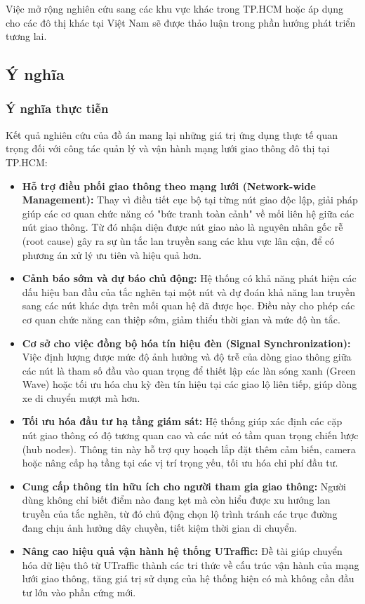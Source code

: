 Việc mở rộng nghiên cứu sang các khu vực khác trong TP.HCM hoặc áp dụng cho các đô thị khác tại Việt Nam sẽ được thảo luận trong phần hướng phát triển tương lai.

\newpage
\subsection{Ý nghĩa}
\subsubsection{Ý nghĩa thực tiễn}
Kết quả nghiên cứu của đồ án mang lại những giá trị ứng dụng thực tế quan trọng đối với công tác quản lý và vận hành mạng lưới giao thông đô thị tại TP.HCM:

\begin{itemize}
    \item \textbf{Hỗ trợ điều phối giao thông theo mạng lưới (Network-wide Management):} Thay vì điều tiết cục bộ tại từng nút giao độc lập, giải pháp giúp các cơ quan chức năng có "bức tranh toàn cảnh" về mối liên hệ giữa các nút giao thông. Từ đó nhận diện được nút giao nào là nguyên nhân gốc rễ (root cause) gây ra sự ùn tắc lan truyền sang các khu vực lân cận, để có phương án xử lý ưu tiên và hiệu quả hơn.
    
    \item \textbf{Cảnh báo sớm và dự báo chủ động:} Hệ thống có khả năng phát hiện các dấu hiệu ban đầu của tắc nghẽn tại một nút và dự đoán khả năng lan truyền sang các nút khác dựa trên mối quan hệ đã được học. Điều này cho phép các cơ quan chức năng can thiệp sớm, giảm thiểu thời gian và mức độ ùn tắc.
    
    \item \textbf{Cơ sở cho việc đồng bộ hóa tín hiệu đèn (Signal Synchronization):} Việc định lượng được mức độ ảnh hưởng và độ trễ của dòng giao thông giữa các nút là tham số đầu vào quan trọng để thiết lập các làn sóng xanh (Green Wave) hoặc tối ưu hóa chu kỳ đèn tín hiệu tại các giao lộ liên tiếp, giúp dòng xe di chuyển mượt mà hơn.
    
    \item \textbf{Tối ưu hóa đầu tư hạ tầng giám sát:} Hệ thống giúp xác định các cặp nút giao thông có độ tương quan cao và các nút có tầm quan trọng chiến lược (hub nodes). Thông tin này hỗ trợ quy hoạch lắp đặt thêm cảm biến, camera hoặc nâng cấp hạ tầng tại các vị trí trọng yếu, tối ưu hóa chi phí đầu tư.
    
    \item \textbf{Cung cấp thông tin hữu ích cho người tham gia giao thông:} Người dùng không chỉ biết điểm nào đang kẹt mà còn hiểu được xu hướng lan truyền của tắc nghẽn, từ đó chủ động chọn lộ trình tránh các trục đường đang chịu ảnh hưởng dây chuyền, tiết kiệm thời gian di chuyển.
    
    \item \textbf{Nâng cao hiệu quả vận hành hệ thống UTraffic:} Đề tài giúp chuyển hóa dữ liệu thô từ UTraffic thành các tri thức về cấu trúc vận hành của mạng lưới giao thông, tăng giá trị sử dụng của hệ thống hiện có mà không cần đầu tư lớn vào phần cứng mới.
\end{itemize}

